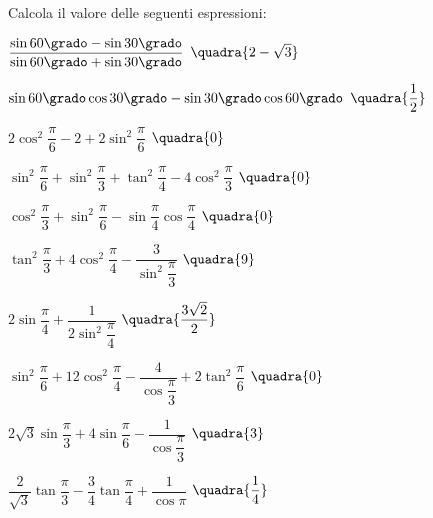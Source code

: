 \begin{esercizio}\label{ese:03.1}
Calcola il valore delle seguenti espressioni:
\begin{multicols}{2}
 \begin{enumeratea}
  \item  $\dfrac{\sin 60 \grado -\sin 30 \grado}
                {\sin 60 \grado +\sin 30 \grado} $
   \hfill $\quadra{2-\sqrt{3}}$
  \item  $\sin 60 \grado \cos 30 \grado - \sin 30 \grado \cos 60 \grado $
   \hfill $\quadra{\dfrac{1}{2}}$
  \item  $2 \cos^2 \dfrac{\pi}{6} - 2 + 2 \sin^2 \dfrac{\pi}{6}$
   \hfill $\quadra{0}$
  \item  $\sin^2 \dfrac{\pi}{6} + \sin^2 \dfrac{\pi}{3} + 
          \tan^2 \dfrac{\pi}{4} - 4 \cos^2 \dfrac{\pi}{3}$
   \hfill $\quadra{0}$
  \item  $\cos^2 \dfrac{\pi}{3} + \sin^2 \dfrac{\pi}{6} - 
          \sin \dfrac{\pi}{4} \cos \dfrac{\pi}{4}$
   \hfill $\quadra{0}$
  \item  $\tan^2 \dfrac{\pi}{3} + 4 \cos^2 \dfrac{\pi}{4} - 
          \dfrac{3}{\sin^2 \dfrac{\pi}{3}}$
   \hfill $\quadra{9}$
  \item  $2 \sin \dfrac{\pi}{4} + \dfrac{1}{2 \sin^2 \dfrac{\pi}{4}}$
   \hfill $\quadra{\dfrac{3 \sqrt{2}}{2}}$
  \item  $\sin^2 \dfrac{\pi}{6} + 12 \cos^2 \dfrac{\pi}{4} - 
          \dfrac{4}{\cos \dfrac{\pi}{3}} + 2 \tan^2 \dfrac{\pi}{6}$
   \hfill $\quadra{0}$
  \item  $2 \sqrt{3} \sin \dfrac{\pi}{3} +4 \sin \dfrac{\pi}{6} - 
          \dfrac{1}{\cos \dfrac{\pi}{3}}$
   \hfill $\quadra{3}$
  \item  $\dfrac{2}{\sqrt{3}} \tan \dfrac{\pi}{3} -
          \dfrac{3}{4} \tan \dfrac{\pi}{4} + 
          \dfrac{1}{\cos \pi} $
   \hfill $\quadra{\dfrac{1}{4}}$
 \end{enumeratea}
 \end{multicols}
\end{esercizio}

